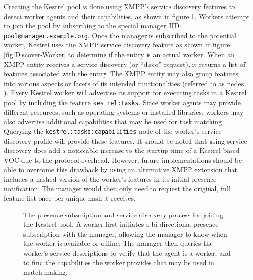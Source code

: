 \label{sec:Kestrel:Joining} Creating the Kestrel pool is done using
XMPP's service discovery features to detect worker agents and their
capabilities, as shown in figure \ref{fig:Joining-the-Pool}. Workers
attempt to join the pool by subscribing to the special manager JID
\texttt{pool@manager.example.org}. Once the manager is subscribed
to the potential worker, Kestrel uses the XMPP service discovery feature
\cite{XEP-0030} as shown in figure \ref{fig:Discover-Worker} to
determine if the entity is an actual worker. When an XMPP entity receives
a service discovery (or {}``disco'' request), it returns a list
of features associated with the entity. The XMPP entity may also group
features into various aspects or facets of its intended functionalities
(referred to as nodes \cite{XEP-0030}). Every Kestrel worker will
advertise its support for executing tasks in a Kestrel pool by including
the feature \texttt{kestrel:tasks}. Since worker agents may provide
different resources, such as operating systems or installed libraries,
workers may also advertise additional capabilities that may be used
for task matching. Querying the \texttt{kestrel:tasks:capabilities}
node of the worker's service discovery profile will provide these
features. It should be noted that using service discovery does add
a noticeable increase to the startup time of a Kestrel-based VOC due
to the protocol overhead. However, future implementations should be
able to overcome this drawback by using an alternative XMPP extension
\cite{XEP-0115} that includes a hashed version of the worker's features
in its initial presence notification. The manager would then only
need to request the original, full feature list once per unique hash
it receives.

%
\begin{figure}
\caption{\label{fig:Joining-the-Pool}The presence subscription and service
discovery process for joining the Kestrel pool. A worker first initiates
a bi-directional presence subscription with the manager, allowing
the manager to know when the worker is available or offline. The manager
then queries the worker's service descriptions to verify that the
agent is a worker, and to find the capabilities the worker provides
that may be used in match making.}

\end{figure}


